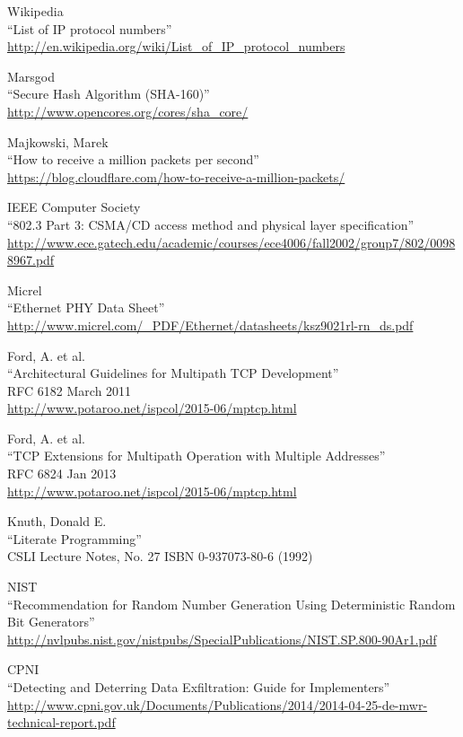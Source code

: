 \begin{thebibliography}{99}
 Wikipedia\\
``List of IP protocol numbers''\\
\url{http://en.wikipedia.org/wiki/List_of_IP_protocol_numbers}

 Marsgod\\
``Secure Hash Algorithm (SHA-160)''\\
\url{http://www.opencores.org/cores/sha_core/}

 Majkowski, Marek\\
``How to receive a million packets per second''\\
\url{https://blog.cloudflare.com/how-to-receive-a-million-packets/}

 IEEE Computer Society\\
``802.3 Part 3: CSMA/CD access method and physical layer specification''\\
\url{http://www.ece.gatech.edu/academic/courses/ece4006/fall2002/group7/802/00988967.pdf}

 Micrel\\
``Ethernet PHY Data Sheet''\\
\url{http://www.micrel.com/_PDF/Ethernet/datasheets/ksz9021rl-rn_ds.pdf}

 Ford, A. et al.\\
``Architectural Guidelines for Multipath TCP Development''\\
RFC 6182 March 2011\\
\url{http://www.potaroo.net/ispcol/2015-06/mptcp.html}

 Ford, A. et al.\\
``TCP Extensions for Multipath Operation with Multiple Addresses''\\
RFC 6824 Jan 2013\\
\url{http://www.potaroo.net/ispcol/2015-06/mptcp.html}

 Knuth, Donald E.\\
``Literate Programming''\\
CSLI Lecture Notes, No. 27 ISBN 0-937073-80-6 (1992)

 NIST\\
``Recommendation for Random Number Generation Using Deterministic Random Bit Generators''\\
\url{http://nvlpubs.nist.gov/nistpubs/SpecialPublications/NIST.SP.800-90Ar1.pdf}

 CPNI\\
``Detecting and Deterring Data Exfiltration: Guide for Implementers''\\
\url{http://www.cpni.gov.uk/Documents/Publications/2014/2014-04-25-de-mwr-technical-report.pdf}


\end{thebibliography}
